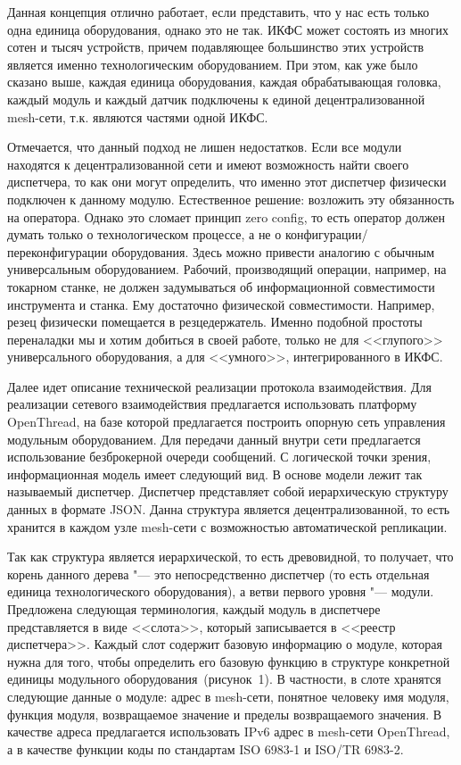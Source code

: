 Данная концепция отлично работает, если представить, что у нас есть только одна единица оборудования, однако это не так. ИКФС может состоять из многих сотен и тысяч устройств, причем подавляющее большинство этих устройств является именно технологическим оборудованием. При этом, как уже было сказано выше, каждая единица оборудования, каждая обрабатывающая головка, каждый модуль и каждый датчик подключены к единой децентрализованной mesh-сети, т.\:к. являются частями одной ИКФС.

Отмечается, что данный подход не лишен недостатков. Если все модули находятся к децентрализованной сети и имеют возможность найти своего диспетчера, то как они могут определить, что именно этот диспетчер физически подключен к данному модулю. Естественное решение: возложить эту обязанность на оператора. Однако это сломает принцип zero config, то есть оператор должен думать только о технологическом процессе, а не о конфигурации/переконфигурации оборудования. Здесь можно привести аналогию с обычным универсальным оборудованием. Рабочий, производящий операции, например, на токарном станке, не должен задумываться об информационной совместимости инструмента и станка. Ему достаточно физической совместимости. Например, резец физически помещается в резцедержатель. Именно подобной простоты переналадки мы и хотим добиться в своей работе, только не для <<глупого>> универсального оборудования, а для <<умного>>, интегрированного в ИКФС.

Далее идет описание технической реализации протокола взаимодействия. Для реализации сетевого взаимодействия предлагается использовать платформу OpenThread, на базе которой предлагается построить опорную сеть управления модульным оборудованием.  Для передачи данный внутри сети предлагается использование безброкерной очереди сообщений. С логической точки зрения, информационная модель имеет следующий вид. В основе модели лежит так называемый диспетчер. Диспетчер представляет собой иерархическую структуру данных в формате JSON. Данна структура является децентрализованной, то есть хранится в каждом узле mesh-сети с возможностью автоматической репликации.

Так как структура является иерархической, то есть древовидной, то получает, что корень данного дерева "--- это непосредственно диспетчер (то есть отдельная единица технологического оборудования), а ветви первого уровня "--- модули. Предложена следующая терминология, каждый модуль в диспетчере представляется в виде <<слота>>, который записывается в <<реестр диспетчера>>. Каждый слот содержит базовую информацию о модуле, которая нужна для того, чтобы определить его базовую функцию в структуре конкретной единицы модульного оборудования~(рисунок~1). В частности, в слоте хранятся следующие данные о модуле: адрес в mesh-сети, понятное человеку имя модуля, функция модуля, возвращаемое значение и пределы возвращаемого значения. В качестве адреса предлагается использовать IPv6 адрес в mesh-сети OpenThread, а в качестве функции коды по стандартам ISO 6983-1 и ISO/TR 6983-2.

